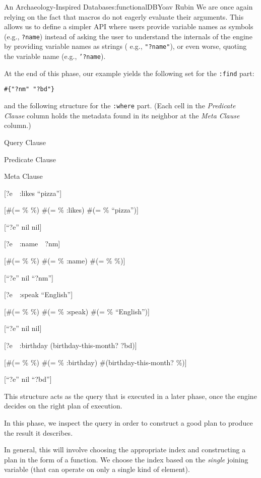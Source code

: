 \begin{aosachapter}{An Archaeology-Inspired Database}{s:functionalDB}{Yoav Rubin}
We are once again relying on the fact that macros do not eagerly
evaluate their arguments. This allows us to define a simpler API where
users provide variable names as symbols (e.g., \texttt{?name}) instead
of asking the user to understand the internals of the engine by
providing variable names as strings ( e.g., \texttt{"?name"}), or even
worse, quoting the variable name (e.g., \texttt{'?name}).

At the end of this phase, our example yields the following set for the
\texttt{:find} part:

\begin{verbatim}
#{"?nm" "?bd"} 
\end{verbatim}

and the following structure for the \texttt{:where} part. (Each cell in
the \emph{Predicate Clause} column holds the metadata found in its
neighbor at the \emph{Meta Clause} column.)

Query Clause

Predicate Clause

Meta Clause

{[}?e~~:likes ``pizza''{]}

{[}\#(= \% \%) \#(= \% :likes) \#(= \% ``pizza''){]}

{[}``?e'' nil nil{]}

{[}?e~~:name~~?nm{]}

{[}\#(= \% \%) \#(= \% :name) \#(= \% \%){]}

{[}``?e'' nil ``?nm''{]}

{[}?e~~:speak ``English''{]}

{[}\#(= \% \%) \#(= \% :speak) \#(= \% ``English''){]}

{[}``?e'' nil nil{]}

{[}?e~~:birthday (birthday-this-month? ?bd){]}

{[}\#(= \% \%) \#(= \% :birthday) \#(birthday-this-month? \%){]}

{[}``?e'' nil ``?bd''{]}

This structure acts as the query that is executed in a later phase, once
the engine decides on the right plan of execution.

\label{phase-2-making-a-plan}

In this phase, we inspect the query in order to construct a good plan to
produce the result it describes.

In general, this will involve choosing the appropriate index and
constructing a plan in the form of a function. We choose the index based
on the \emph{single} joining variable (that can operate on only a single
kind of element).


\end{aosachapter}

